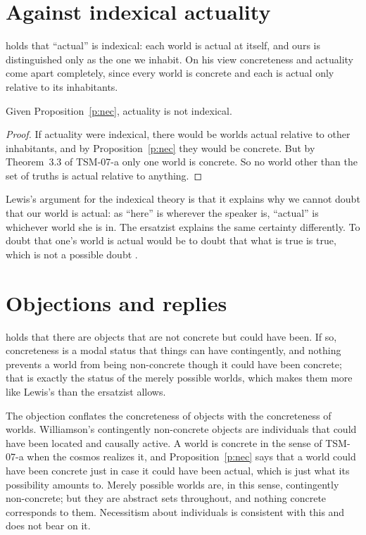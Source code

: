 \documentclass{situationist-preprint}
\begin{document}
\section{Against indexical actuality}

\citet{Lewis1970,Lewis1986} holds that \enquote{actual} is indexical: each world is actual at itself, and ours is distinguished only as the one we inhabit. On his view concreteness and actuality come apart completely, since every world is concrete and each is actual only relative to its inhabitants.

\begin{proposition}\label{p:absolute}
Given Proposition~\ref{p:nec}, actuality is not indexical.
\end{proposition}

\begin{proof}
If actuality were indexical, there would be worlds actual relative to other inhabitants, and by Proposition~\ref{p:nec} they would be concrete. But by Theorem~3.3 of TSM-07-a only one world is concrete. So no world other than the set of truths is actual relative to anything.
\end{proof}

Lewis's argument for the indexical theory is that it explains why we cannot doubt that our world is actual: as \enquote{here} is wherever the speaker is, \enquote{actual} is whichever world she is in. The ersatzist explains the same certainty differently. To doubt that one's world is actual would be to doubt that what is true is true, which is not a possible doubt \citep{Adams1974}.

\section{Objections and replies}

\begin{objection}
\citet{Williamson2013} holds that there are objects that are not concrete but could have been. If so, concreteness is a modal status that things can have contingently, and nothing prevents a world from being non-concrete though it could have been concrete; that is exactly the status of the merely possible worlds, which makes them more like Lewis's than the ersatzist allows.
\end{objection}

\begin{reply}
The objection conflates the concreteness of objects with the concreteness of worlds. Williamson's contingently non-concrete objects are individuals that could have been located and causally active. A world is concrete in the sense of TSM-07-a when the cosmos realizes it, and Proposition~\ref{p:nec} says that a world could have been concrete just in case it could have been actual, which is just what its possibility amounts to. Merely possible worlds are, in this sense, contingently non-concrete; but they are abstract sets throughout, and nothing concrete corresponds to them. Necessitism about individuals is consistent with this and does not bear on it.
\end{reply}
\end{document}
